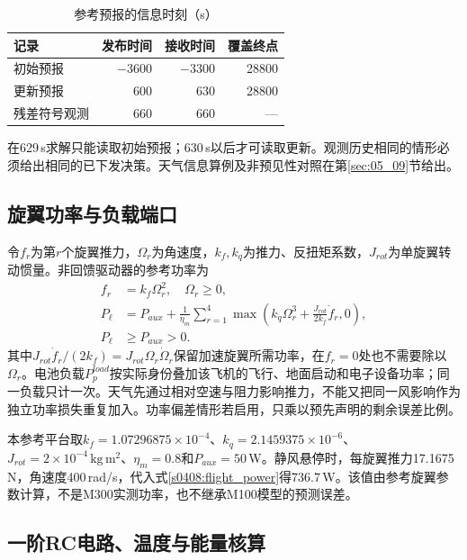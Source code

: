 \begin{table}[!ht]\centering
\caption{参考预报的信息时刻（s）}
\begin{tabular}{lrrr}\toprule
记录 & 发布时间 & 接收时间 & 覆盖终点\\\midrule
初始预报 & $-3600$ & $-3300$ & 28800\\
更新预报 & 600 & 630 & 28800\\
残差符号观测 & 660 & 660 & ---\\\bottomrule
\end{tabular}
\end{table}
在629\,s求解只能读取初始预报；630\,s以后才可读取更新。观测历史相同的情形必须给出相同的已下发决策。天气信息算例及非预见性对照在第\ref{sec:05_09}节给出。

\subsection{旋翼功率与负载端口}

令$f_r$为第$r$个旋翼推力，$\Omega_r$为角速度，$k_f,k_q$为推力、反扭矩系数，$J_{rot}$为单旋翼转动惯量。非回馈驱动器的参考功率为
\begin{align}
 f_r&=k_f\Omega_r^2,\quad \Omega_r\ge0,\\
 P_\ell&=P_{aux}+\frac1{\eta_m}\sum_{r=1}^4
 \max\left(k_q\Omega_r^3+\frac{J_{rot}}{2k_f}\dot f_r,0\right),
 \label{s0408:flight_power}\\
 P_\ell&\ge P_{aux}>0.
 \label{s0408:power_nonnegative}
\end{align}
其中$J_{rot}\dot f_r/(2k_f)=J_{rot}\Omega_r\dot\Omega_r$保留加速旋翼所需功率，在$f_r=0$处也不需要除以$\Omega_r$。电池负载$P_p^{load}$按实际身份叠加该飞机的飞行、地面启动和电子设备功率；同一负载只计一次。天气先通过相对空速与阻力影响推力，不能又把同一风影响作为独立功率损失重复加入。功率偏差情形若启用，只乘以预先声明的剩余误差比例。

本参考平台取$k_f=1.07296875\times10^{-4}$、$k_q=2.1459375\times10^{-6}$、$J_{rot}=2\times10^{-4}\,\mathrm{kg\,m^2}$、$\eta_m=0.8$和$P_{aux}=50$\,W。静风悬停时，每旋翼推力17.1675\,N，角速度400\,rad/s，代入式\eqref{s0408:flight_power}得736.7\,W。该值由参考旋翼参数计算，不是M300实测功率，也不继承M100模型的预测误差。

\subsection{一阶RC电路、温度与能量核算}

